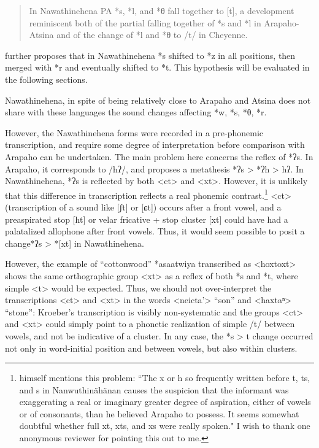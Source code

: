 \documentclass[oldfontcommands,oneside,a4paper,11pt]{article}
\begin{document}
\begin{quote}
In Nawathinehena PA *s, *l, and *θ fall together to [t], a development reminiscent both of the partial falling together of *s and *l in Arapaho-Atsina and of the change of *l and *θ to /t/ in Cheyenne.
\end{quote}

 \citet[76]{goddard01plains} further proposes that in Nawathinehena *s shifted to *z in all positions,  then merged with *r and eventually shifted to *t. This hypothesis will be evaluated in the following sections.

Nawathinehena, in spite of being relatively close to Arapaho and Atsina does not share with these languages the sound changes affecting *w, *s, *θ, *r.

However, the Nawathinehena forms were recorded in a pre-phonemic transcription, and require some degree of interpretation before comparison with Arapaho can be undertaken. The main problem here concerns the reflex  of   *ʔs. In Arapaho, it corresponds to /hʔ/, and  \citet[110]{goddard74arapaho} proposes a metathesis *ʔs > *ʔh > hʔ. In Nawathinehena, *ʔs is reflected by both <ct> and  <xt>. However, it is unlikely that this difference in transcription reflects a real phonemic contrast.\footnote{\citet[82]{kroeber16arapaho} himself mentions this problem: 
``The x or h so frequently written before t, ts, and s in Nanwuthinähänan causes the suspicion that the informant was exaggerating a real or imaginary greater degree of aspiration, either of vowels or of consonants, than he believed Arapaho to possess. It seems somewhat doubtful whether full xt, xts, and xs were really spoken." I wish to thank one anonymous reviewer for pointing this out to me.} <ct> (transcription of a sound like [ʃt] or [ɕt]) occurs after a front vowel, and a preaspirated stop [ht] or velar fricative + stop cluster [xt] could have had a palatalized allophone after front vowels. Thus, it would seem possible to posit a change*ʔs > *[xt] in Nawathinehena. 


However, the example of ``cottonwood'' 	*asaatwiya transcribed as <hoxtoxt> shows the same orthographic group <xt> as a reflex of both *s and *t, where simple <t> would be expected. Thus, we should not over-interpret the transcriptions <ct> and <xt> in the words <neicta'> ``son'' and <haxtaⁿ> ``stone'': Kroeber's transcription is visibly non-systematic and the  groups <ct> and <xt> could simply point to a phonetic realization of simple /t/ between vowels, and not be indicative of a cluster. In any case, the *s > t change occurred not only in word-initial position and between vowels, but also within clusters. 
\end{document}
